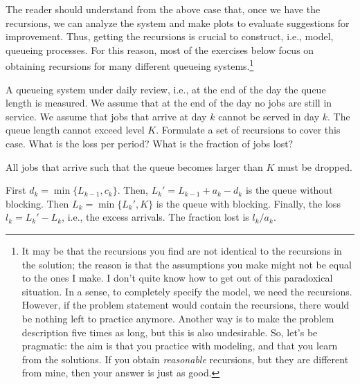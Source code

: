 The reader should understand from the above case that, once we have the recursions, we can analyze the system and make plots to evaluate suggestions for improvement.
Thus, getting the recursions is crucial to construct, i.e., model, queueing processes.
For this reason, most of the exercises below focus on obtaining recursions for many different queueing systems.\footnote{It may be that the recursions you find are not identical to the recursions in the solution; the reason is that the assumptions you make might not be equal to the ones I make.
  I don't quite know how to get out of this paradoxical situation.
  In a sense, to completely specify the model, we need the recursions.
  However, if the problem statement would contain the recursions, there would be nothing left to practice anymore.
  Another way is to make the problem description five times as long, but this is also undesirable.
  So, let's be pragmatic: the aim is that you practice with modeling, and that you learn from the solutions.
  If you obtain \emph{reasonable} recursions, but they are different from mine, then your answer is just as good.}

\begin{exercise} A queueing system
  under daily review, i.e., at the end of the day the queue length is
  measured. We assume that at the end of the day no jobs are still in
  service. We assume that jobs that arrive at day $k$ cannot be served
  in day $k$. The queue length cannot exceed level $K$.  Formulate a
  set of recursions to cover this case. What is the loss per period? What is the fraction of jobs lost?
\begin{solution}

    All jobs that arrive such that the queue becomes larger than $K$
    must be dropped. 

First $d_k = \min\{L_{k-1}, c_k\}$. Then, $L_k' = L_{k-1}+a_k-d_k$ is the queue without blocking. Then $L_k=\min\{L_k', K\}$ is the queue with blocking. Finally, the loss $l_k=L_k'-L_k$, i.e., the excess arrivals. The fraction lost is $l_k/a_k$. 
\end{solution}
\end{exercise}

